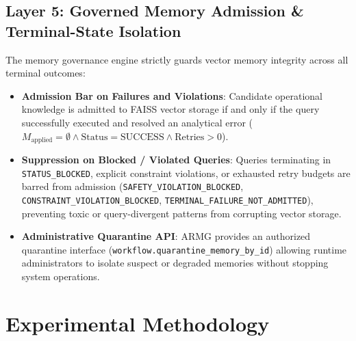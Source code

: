 \documentclass[conference]{IEEEtran}
\begin{document}
\subsection{Layer 5: Governed Memory Admission \& Terminal-State Isolation}
The memory governance engine strictly guards vector memory integrity across all terminal outcomes:
\begin{itemize}
    \item \textbf{Admission Bar on Failures and Violations}: Candidate operational knowledge is admitted to FAISS vector storage if and only if the query successfully executed and resolved an analytical error ($M_{\text{applied}} = \emptyset \land \text{Status} = \text{SUCCESS} \land \text{Retries} > 0$).
    \item \textbf{Suppression on Blocked / Violated Queries}: Queries terminating in \texttt{STATUS\_BLOCKED}, explicit constraint violations, or exhausted retry budgets are barred from admission (\texttt{SAFETY\_VIOLATION\_BLOCKED}, \texttt{CONSTRAINT\_VIOLATION\_BLOCKED}, \texttt{TERMINAL\_FAILURE\_NOT\_ADMITTED}), preventing toxic or query-divergent patterns from corrupting vector storage.
    \item \textbf{Administrative Quarantine API}: ARMG provides an authorized quarantine interface (\texttt{workflow.quarantine\_memory\_by\_id}) allowing runtime administrators to isolate suspect or degraded memories without stopping system operations.
\end{itemize}

\section{Experimental Methodology}
\end{document}
